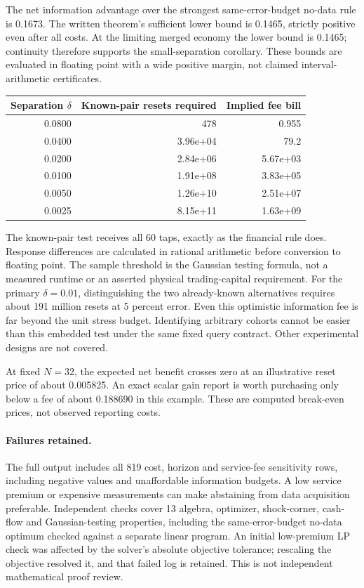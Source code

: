 \documentclass[12pt]{article}
\theoremstyle{definition}
\theoremstyle{remark}
\begin{document}
The net information advantage over the strongest same-error-budget no-data rule is 0.1673. The written theorem's sufficient lower bound is 0.1465, strictly positive even after all costs. At the limiting merged economy the lower bound is 0.1465; continuity therefore supports the small-separation corollary. These bounds are evaluated in floating point with a wide positive margin, not claimed interval-arithmetic certificates.
\begin{center}\small\begin{tabular}{rrr}
\toprule
Separation $\delta$ & Known-pair resets required & Implied fee bill\\
\midrule
0.0800 & 478 & 0.955\\
0.0400 & 3.96e+04 & 79.2\\
0.0200 & 2.84e+06 & 5.67e+03\\
0.0100 & 1.91e+08 & 3.83e+05\\
0.0050 & 1.26e+10 & 2.51e+07\\
0.0025 & 8.15e+11 & 1.63e+09\\
\bottomrule\end{tabular}\end{center}
The known-pair test receives all 60 taps, exactly as the financial rule does.
Response differences are calculated in rational arithmetic before conversion
to floating point. The sample threshold is the Gaussian testing formula, not
a measured runtime or an asserted physical trading-capital requirement.
For the primary $\delta=0.01$, distinguishing the two already-known
alternatives requires about 191 million resets at 5 percent error. Even
this optimistic information fee is far beyond the unit stress budget.
Identifying arbitrary cohorts cannot be easier than this embedded test under
the same fixed query contract. Other experimental designs are not covered.

At fixed $N=32$, the expected net benefit crosses zero at an illustrative reset price of about 0.005825. An exact scalar gain report is worth purchasing only below a fee of about 0.188690 in this example. These are computed break-even prices, not observed reporting costs.
\paragraph{Failures retained.}
The full output includes all 819 cost, horizon and service-fee sensitivity
rows, including negative values and unaffordable information budgets.
A low service premium or expensive measurements can make abstaining from
data acquisition preferable. Independent checks cover 13 algebra, optimizer,
shock-corner, cash-flow and Gaussian-testing properties, including the
same-error-budget no-data optimum checked against a separate linear program.
An initial low-premium LP check was affected by the solver's absolute
objective tolerance; rescaling the objective resolved it, and that failed
log is retained. This is not independent mathematical proof review.
\end{document}
